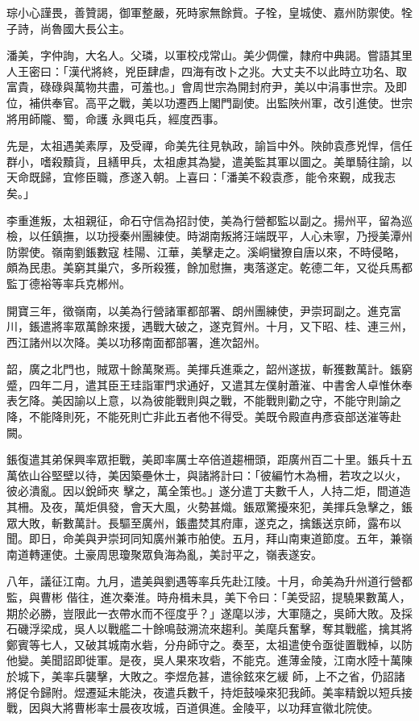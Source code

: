 \begin{pinyinscope}
 琮小心謹畏，善贊謁，御軍整嚴，死時家無餘貲。子牷，皇城使、嘉州防禦使。牷子詩，尚魯國大長公主。



 潘美，字仲詢，大名人。父璘，以軍校戍常山。美少倜儻，隸府中典謁。嘗語其里人王密曰：「漢代將終，兇臣肆虐，四海有改卜之兆。大丈夫不以此時立功名、取富貴，碌碌與萬物共盡，可羞也。」會周世宗為開封府尹，美以中涓事世宗。及即位，補供奉官。高平之戰，美以功遷西上閣門副使。出監陜州軍，改引進使。世宗將用師隴、蜀，命護
 永興屯兵，經度西事。



 先是，太祖遇美素厚，及受禪，命美先往見執政，諭旨中外。陜帥袁彥兇悍，信任群小，嗜殺黷貨，且繕甲兵，太祖慮其為變，遣美監其軍以圖之。美單騎往諭，以天命既歸，宜修臣職，彥遂入朝。上喜曰：「潘美不殺袁彥，能令來覲，成我志矣。」



 李重進叛，太祖親征，命石守信為招討使，美為行營都監以副之。揚州平，留為巡檢，以任鎮撫，以功授秦州團練使。時湖南叛將汪端既平，人心未寧，乃授美潭州防禦使。嶺南劉鋹數寇
 桂陽、江華，美擊走之。溪峒蠻獠自唐以來，不時侵略，頗為民患。美窮其巢穴，多所殺獲，餘加慰撫，夷落遂定。乾德二年，又從兵馬都監丁德裕等率兵克郴州。



 開寶三年，徵嶺南，以美為行營諸軍都部署、朗州團練使，尹崇珂副之。進克富川，鋹遣將率眾萬餘來援，遇戰大破之，遂克賀州。十月，又下昭、桂、連三州，西江諸州以次降。美以功移南面都部署，進次韶州。



 韶，廣之北門也，賊眾十餘萬聚焉。美揮兵進乘之，韶州遂拔，斬獲數萬計。鋹窮
 蹙，四年二月，遣其臣王珪詣軍門求通好，又遣其左僕射蕭漼、中書舍人卓惟休奉表乞降。美因諭以上意，以為彼能戰則與之戰，不能戰則勸之守，不能守則諭之降，不能降則死，不能死則亡非此五者他不得受。美既令殿直冉彥袞部送漼等赴闕。



 鋹復遣其弟保興率眾拒戰，美即率厲士卒倍道趨柵頭，距廣州百二十里。鋹兵十五萬依山谷堅壁以待，美因築壘休士，與諸將計曰：「彼編竹木為柵，若攻之以火，彼必潰亂。因以銳師夾
 擊之，萬全策也。」遂分遣丁夫數千人，人持二炬，間道造其柵。及夜，萬炬俱發，會天大風，火勢甚熾。鋹眾驚擾來犯，美揮兵急擊之，鋹眾大敗，斬數萬計。長驅至廣州，鋹盡焚其府庫，遂克之，擒鋹送京師，露布以聞。即日，命美與尹崇珂同知廣州兼市舶使。五月，拜山南東道節度。五年，兼嶺南道轉運使。土豪周思瓊聚眾負海為亂，美討平之，嶺表遂安。



 八年，議征江南。九月，遣美與劉遇等率兵先赴江陵。十月，命美為升州道行營都監，與曹彬
 偕往，進次秦淮。時舟楫未具，美下令曰：「美受詔，提驍果數萬人，期於必勝，豈限此一衣帶水而不徑度乎？」遂麾以涉，大軍隨之，吳師大敗。及採石磯浮梁成，吳人以戰艦二十餘鳴鼓溯流來趨利。美麾兵奮擊，奪其戰艦，擒其將鄭賓等七人，又破其城南水砦，分舟師守之。奏至，太祖遣使令亟徙置戰棹，以防他變。美聞詔即徙軍。是夜，吳人果來攻砦，不能克。進薄金陵，江南水陸十萬陳於城下，美率兵襲擊，大敗之。李煜危甚，遣徐鉉來乞緩
 師，上不之省，仍詔諸將促令歸附。煜遷延未能決，夜遣兵數千，持炬鼓噪來犯我師。美率精銳以短兵接戰，因與大將曹彬率士晨夜攻城，百道俱進。金陵平，以功拜宣徽北院使。




\end{pinyinscope}
